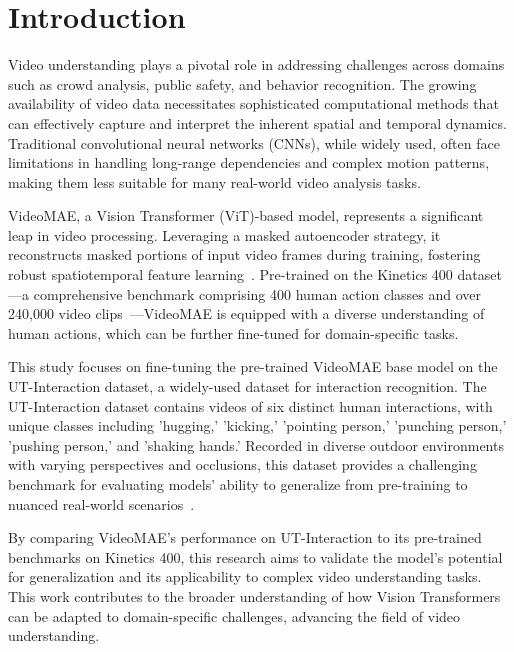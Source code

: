 \documentclass[runningheads]{llncs}
\begin{document}
	
	\section{Introduction}
	Video understanding plays a pivotal role in addressing challenges across domains such as crowd analysis, public safety, and behavior recognition. The growing availability of video data necessitates sophisticated computational methods that can effectively capture and interpret the inherent spatial and temporal dynamics. Traditional convolutional neural networks (CNNs), while widely used, often face limitations in handling long-range dependencies and complex motion patterns, making them less suitable for many real-world video analysis tasks.
	
	VideoMAE, a Vision Transformer (ViT)-based model, represents a significant leap in video processing. Leveraging a masked autoencoder strategy, it reconstructs masked portions of input video frames during training, fostering robust spatiotemporal feature learning~\cite{videomae_paper}. Pre-trained on the Kinetics 400 dataset—a comprehensive benchmark comprising 400 human action classes and over 240,000 video clips~\cite{kinetics400}—VideoMAE is equipped with a diverse understanding of human actions, which can be further fine-tuned for domain-specific tasks.
	
	This study focuses on fine-tuning the pre-trained VideoMAE base model on the UT-Interaction dataset, a widely-used dataset for interaction recognition. The UT-Interaction dataset contains videos of six distinct human interactions, with unique classes including 'hugging,' 'kicking,' 'pointing person,' 'punching person,' 'pushing person,' and 'shaking hands.' Recorded in diverse outdoor environments with varying perspectives and occlusions, this dataset provides a challenging benchmark for evaluating models' ability to generalize from pre-training to nuanced real-world scenarios~\cite{utdataset}.
	
	By comparing VideoMAE’s performance on UT-Interaction to its pre-trained benchmarks on Kinetics 400, this research aims to validate the model’s potential for generalization and its applicability to complex video understanding tasks. This work contributes to the broader understanding of how Vision Transformers can be adapted to domain-specific challenges, advancing the field of video understanding.
	
	
\end{document}
